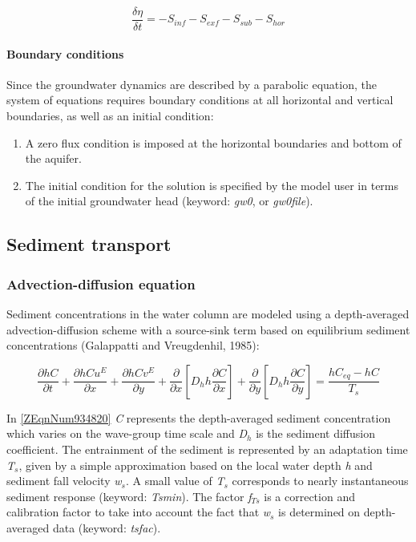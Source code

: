 \documentclass{article}
\begin{document}
\noindent 
\begin{equation} \label{2.75)} 
\frac{\delta \eta }{\delta t} =-S_{inf} -S_{exf} -S_{sub} -S_{hor}  
\end{equation} 


\paragraph{ Boundary conditions}

\noindent Since the groundwater dynamics are described by a parabolic equation, the system of equations requires boundary conditions at all horizontal and vertical boundaries, as well as an initial condition:

\begin{enumerate}
\item  A zero flux condition is imposed at the horizontal boundaries and bottom of the aquifer. 

\item  The initial condition for the solution is specified by the model user in terms of the initial groundwater head (keyword: \textit{gw0}, or \textit{gw0file}).
\end{enumerate}


\subsection{ Sediment transport}


\subsubsection{ Advection-diffusion equation}

\noindent Sediment concentrations in the water column are modeled using a depth-averaged advection-diffusion scheme with a source-sink term based on equilibrium sediment concentrations (Galappatti and Vreugdenhil, 1985):

\noindent 
\begin{equation} \label{ZEqnNum934820} 
\frac{\partial hC}{\partial t} +\frac{\partial hCu^{E} }{\partial x} +\frac{\partial hCv^{E} }{\partial y} +\frac{\partial }{\partial x} \left[D_{h} h\frac{\partial C}{\partial x} \right]+\frac{\partial }{\partial y} \left[D_{h} h\frac{\partial C}{\partial y} \right]=\frac{hC_{eq} -hC}{T_{s} }  
\end{equation} 


\noindent In \eqref{ZEqnNum934820} \textit{C} represents the depth-averaged sediment concentration which varies on the wave-group time scale and \textit{D${}_{h}$} is the sediment diffusion coefficient. The entrainment of the sediment is represented by an adaptation time \textit{T${}_{s}$}, given by a simple approximation based on the local water depth \textit{h} and sediment fall velocity \textit{w${}_{s}$}. A small value of \textit{T${}_{s}$} corresponds to nearly instantaneous sediment response (keyword: \textit{Tsmin}). The factor \textit{f${}_{Ts}$} is a correction and calibration factor to take into account the fact that \textit{w${}_{s}$} is determined on depth-averaged data (keyword: \textit{tsfac}).
\end{document}
